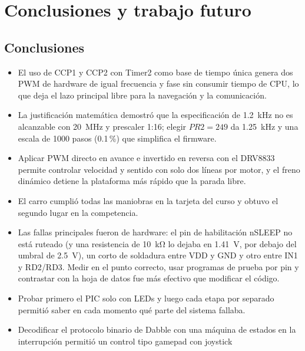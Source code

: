 \section{Conclusiones y trabajo futuro}
\label{sec:conclusiones}

\subsection{Conclusiones}

\begin{itemize}
  \item El uso de CCP1 y CCP2 con Timer2 como base de tiempo única genera dos
        PWM de hardware de igual frecuencia y fase sin consumir tiempo de CPU,
        lo que deja el lazo principal libre para la navegación y la
        comunicación.
  \item La justificación matemática demostró que la especificación de
        \SI{1.2}{\kilo\hertz} no es alcanzable con \SI{20}{\mega\hertz} y
        prescaler 1:16; elegir $PR2 = 249$ da \SI{1.25}{\kilo\hertz} y una
        escala de 1000 pasos (0.1\,\%) que simplifica el firmware.
  \item Aplicar PWM directo en avance e invertido en reversa con el DRV8833
        permite controlar velocidad y sentido con solo dos líneas por motor, y
        el freno dinámico detiene la plataforma más rápido que la parada libre.
  \item El carro cumplió todas las maniobras en la tarjeta del curso y obtuvo
        el segundo lugar en la competencia.
  \item Las fallas principales fueron de hardware: el pin de habilitación
        nSLEEP no está ruteado (y una resistencia de \SI{10}{\kilo\ohm} lo
        dejaba en \SI{1.41}{\volt}, por debajo del umbral de
        \SI{2.5}{\volt}), un corto de soldadura entre VDD y GND y otro entre
        IN1 y RD2/RD3. Medir en el punto correcto, usar programas de prueba
        por pin y contrastar con la hoja de datos fue más efectivo que
        modificar el código.
  \item Probar primero el PIC solo con LEDs y luego cada etapa por separado
        permitió saber en cada momento qué parte del sistema fallaba.
  \item Decodificar el protocolo binario de Dabble con una máquina de estados
        en la interrupción permitió un control tipo gamepad con joystick

\end{itemize}
